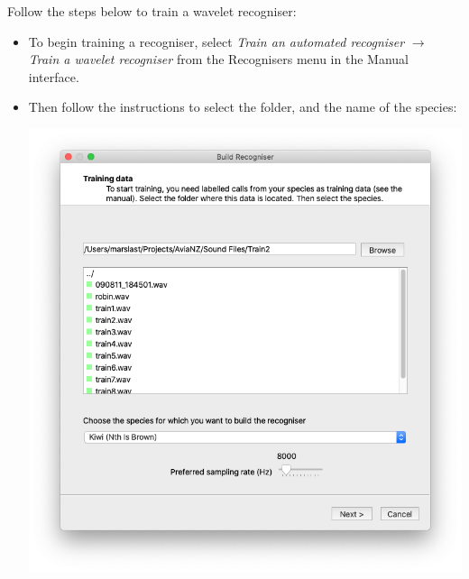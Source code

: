 \documentclass{scrartcl}
\begin{document}
Follow the steps below to train a wavelet recogniser:
\begin{itemize}
\item To begin training a recogniser, select \textit{Train an automated recogniser} $\rightarrow$ \textit{Train a wavelet recogniser} from the Recognisers menu in the Manual interface. 
\item Then follow the instructions to select the folder, and the name of the species:
\begin{center}
    \includegraphics[width=.8\textwidth]{Figures/BuildRecogniser1}
\end{center}


\end{itemize}
\end{document}
